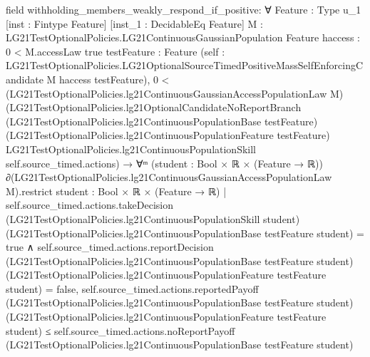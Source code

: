 \documentclass[10pt]{article}
\begin{document}
\begin{ReviewVerbatim}
field withholding_members_weakly_respond_if_positive:
∀ {Feature : Type u_1} [inst : Fintype Feature] [inst_1 : DecidableEq Feature]
  {M : LG21TestOptionalPolicies.LG21ContinuousGaussianPopulation Feature} {haccess : 0 < M.accessLaw {true}}
  {testFeature : Feature}
  (self : LG21TestOptionalPolicies.LG21OptionalSourceTimedPositiveMassSelfEnforcingCandidate M haccess testFeature),
  0 <
      (LG21TestOptionalPolicies.lg21ContinuousGaussianAccessPopulationLaw M)
        (LG21TestOptionalPolicies.lg21OptionalCandidateNoReportBranch
          (LG21TestOptionalPolicies.lg21ContinuousPopulationBase testFeature)
          (LG21TestOptionalPolicies.lg21ContinuousPopulationFeature testFeature)
          LG21TestOptionalPolicies.lg21ContinuousPopulationSkill self.source_timed.actions) →
    ∀ᵐ (student :
      Bool ×
        ℝ ×
          (Feature →
            ℝ)) ∂(LG21TestOptionalPolicies.lg21ContinuousGaussianAccessPopulationLaw M).restrict
        {student : Bool × ℝ × (Feature → ℝ) |
          self.source_timed.actions.takeDecision (LG21TestOptionalPolicies.lg21ContinuousPopulationSkill student)
                (LG21TestOptionalPolicies.lg21ContinuousPopulationBase testFeature student) =
              true ∧
            self.source_timed.actions.reportDecision
                (LG21TestOptionalPolicies.lg21ContinuousPopulationBase testFeature student)
                (LG21TestOptionalPolicies.lg21ContinuousPopulationFeature testFeature student) =
              false},
      self.source_timed.actions.reportedPayoff
          (LG21TestOptionalPolicies.lg21ContinuousPopulationBase testFeature student)
          (LG21TestOptionalPolicies.lg21ContinuousPopulationFeature testFeature student) ≤
        self.source_timed.actions.noReportPayoff
          (LG21TestOptionalPolicies.lg21ContinuousPopulationBase testFeature student)


\end{ReviewVerbatim}
\end{document}
